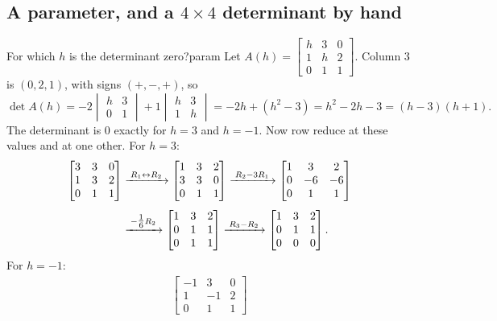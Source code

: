 \documentclass[11pt]{article}
\begin{document}
\subsection*{A parameter, and a $4\times4$ determinant by hand}

\begin{exmp}{For which $h$ is the determinant zero?}{param}
Let $A(h)=\begin{bmatrix}h&3&0\\1&h&2\\0&1&1\end{bmatrix}$. Column $3$ is $(0,2,1)$, with signs $(+,-,+)$, so
\[
\det A(h)=-2\begin{vmatrix}h&3\\0&1\end{vmatrix}+1\begin{vmatrix}h&3\\1&h\end{vmatrix}=-2h+(h^2-3)=h^2-2h-3=(h-3)(h+1).
\]
The determinant is $0$ exactly for $h=3$ and $h=-1$. Now row reduce at these values and at one other. For $h=3$:
\begin{align*}
\begin{bmatrix}3&3&0\\1&3&2\\0&1&1\end{bmatrix}
&\xrightarrow{\;R_1\leftrightarrow R_2\;}
\begin{bmatrix}1&3&2\\3&3&0\\0&1&1\end{bmatrix}
\xrightarrow{\;R_2-3R_1\;}
\begin{bmatrix}1&3&2\\0&-6&-6\\0&1&1\end{bmatrix}\\[4pt]
&\xrightarrow{\;-\tfrac16R_2\;}
\begin{bmatrix}1&3&2\\0&1&1\\0&1&1\end{bmatrix}
\xrightarrow{\;R_3-R_2\;}
\begin{bmatrix}1&3&2\\0&1&1\\0&0&0\end{bmatrix}.
\end{align*}
For $h=-1$:
\begin{align*}
\begin{bmatrix}-1&3&0\\1&-1&2\\0&1&1\end{bmatrix}

\end{align*}
\end{exmp}
\end{document}
